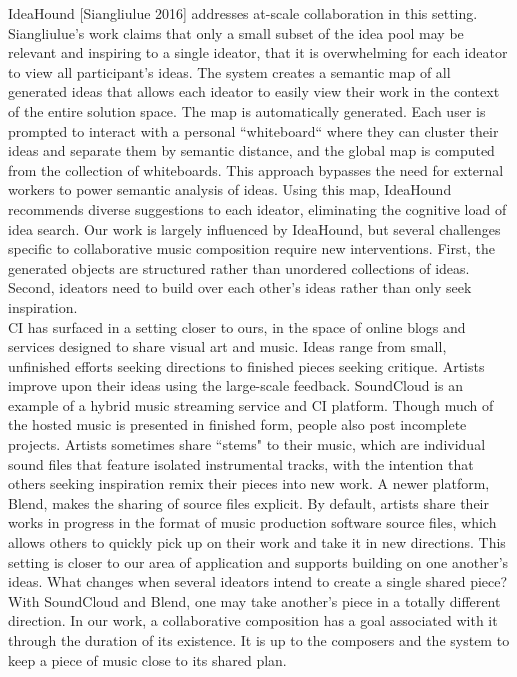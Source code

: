 \documentclass[final,authoryear,5p,times,twocolumn]{elsarticle}
\begin{document}
IdeaHound [Siangliulue 2016] addresses at-scale collaboration in this setting. Siangliulue's work claims that only a small subset of the idea pool may be relevant and inspiring to a single ideator, that it is overwhelming for each ideator to view all participant's ideas. The system creates a semantic map of all generated ideas that allows each ideator to easily view their work in the context of the entire solution space. The map is automatically generated. Each user is prompted to interact with a personal ``whiteboard`` where they can cluster their ideas and separate them by semantic distance, and the global map is computed from the collection of whiteboards. This approach bypasses the need for external workers to power semantic analysis of ideas.  Using this map, IdeaHound recommends diverse suggestions to each ideator, eliminating the cognitive load of idea search. Our work is largely influenced by IdeaHound, but several challenges specific to collaborative music composition require new interventions. First, the generated objects are structured rather than unordered collections of ideas. Second, ideators need to build over each other's ideas rather than only seek inspiration.\\
\indent CI has surfaced in a setting closer to ours, in the space of online blogs and services designed to share visual art and music. Ideas range from small, unfinished efforts seeking directions to finished pieces seeking critique. Artists improve upon their ideas using the large-scale feedback. SoundCloud is an example of a hybrid music streaming service and CI platform. Though much of the hosted music is presented in finished form, people also post incomplete projects. Artists sometimes share ``stems" to their music, which are individual sound files that feature isolated instrumental tracks, with the intention that others seeking inspiration remix their pieces into new work. A newer platform, Blend, makes the sharing of source files explicit. By default, artists share their works in progress in the format of music production software source files, which allows others to quickly pick up on their work and take it in new directions. This setting is closer to our area of application and supports building on one another's ideas.  What changes when several ideators intend to create a single shared piece? With SoundCloud and Blend, one may take another's piece in a totally different direction. In our work, a collaborative composition has a goal associated with it through the duration of its existence. It is up to the composers and the system to keep a piece of music close to its shared plan.
\end{document}
